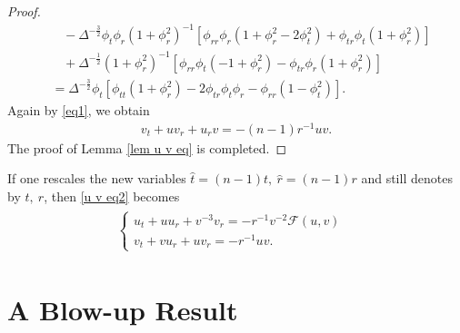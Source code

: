\documentclass[10pt,leqno]{amsart}
\numberwithin{equation}{section}
\begin{document}
\begin{proof}
\begin{equation*}
\begin{aligned}
			& \ \ \ \ -\Delta^{-\frac{3}{2}} \phi_{t}\phi_{r} (1+\phi_{r}^{2})^{-1} [ \phi_{rr} \phi_{r} ( 1+\phi_{r}^{2} - 2 \phi_{t}^{2} ) + \phi_{tr} \phi_{t} (1+\phi_{r}^{2}) ] \\
			& \ \ \ \ +\Delta^{-\frac{1}{2}} (1+\phi_{r}^{2})^{-1} [ \phi_{rr}\phi_{t} (-1+\phi_{r}^{2}) - \phi_{tr} \phi_{r}(1+\phi_{r}^{2}) ] \\
			&= \Delta^{-\frac{3}{2}} \phi_{t} [ \phi_{tt}(1+\phi_{r}^{2}) - 2\phi_{tr} \phi_{t}\phi_{r} - \phi_{rr}(1-\phi_{t}^{2}) ].
		\end{aligned}
	\end{equation*}
	Again by \eqref{eq1}, we obtain
	\begin{equation*}
		\begin{aligned}
			v_{t} + uv_{r} + u_{r}v = -(n-1)r^{-1}  uv.
		\end{aligned}
	\end{equation*}
	The proof of Lemma \ref{lem u v eq} is completed.
	
	
\end{proof}



If one rescales the new variables $\hat{t} = (n-1)t, \ \hat{r} = (n-1)r$ and still denotes by $t,\ r$, then \eqref{u v eq2} becomes
\begin{equation} \label{u v eq3}
	\begin{aligned}
		\begin{split}
			\left\lbrace
			\begin{array}{lr}
				u_{t} + uu_{r} + v^{-3}v_{r} = - r^{-1} v^{-2} \mathcal{F} (u,v) & \\ 
				v_{t} + v u_{r} + uv_{r} =- r^{-1} uv . &
			\end{array}	
			\right.
		\end{split}	
	\end{aligned}
\end{equation}








\section{A Blow-up Result} \label{sec proof}
\end{document}
